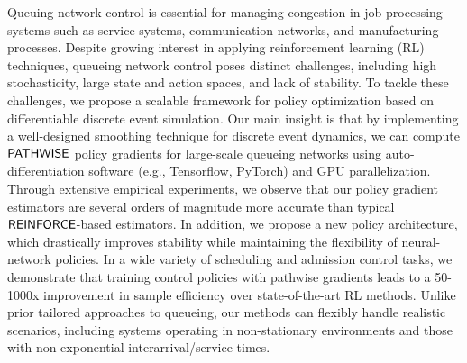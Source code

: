 Queuing network control is essential for managing congestion in job-processing systems 
such as service systems, communication networks, and manufacturing processes. Despite growing interest in applying reinforcement learning (RL) techniques,  queueing network control
poses distinct challenges, including high stochasticity, large state and action spaces, and lack of stability. 
To tackle these challenges, we propose a scalable framework for policy optimization based on differentiable discrete event simulation. 
Our main insight is that by implementing a well-designed smoothing technique for discrete event dynamics, we can compute $\mathsf{PATHWISE}$ policy gradients for large-scale queueing networks using auto-differentiation software (e.g., Tensorflow, PyTorch) and GPU parallelization. Through extensive empirical experiments, we observe that our policy gradient estimators are several orders of magnitude more accurate than typical $\mathsf{REINFORCE}$-based  estimators. 
In addition, we propose a new policy architecture, which drastically improves stability while maintaining the flexibility of neural-network policies.
In a wide variety of scheduling and admission control tasks, we demonstrate that training control policies with pathwise gradients leads to a 50-1000x improvement in sample efficiency over state-of-the-art RL methods.
Unlike prior tailored approaches to queueing, our methods can flexibly handle realistic scenarios, including systems operating in non-stationary environments and those with non-exponential interarrival/service times.




